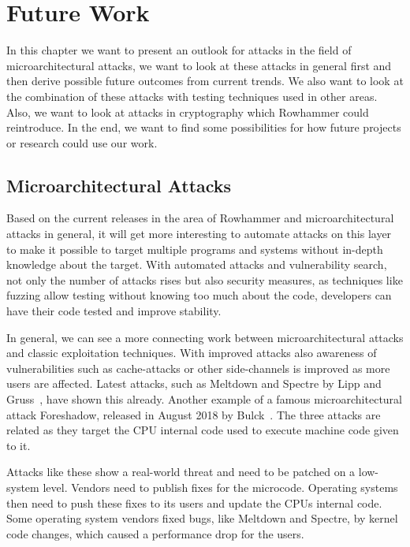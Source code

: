 \chapter{Future Work}\label{sec:futurework}

In this chapter we want to present an outlook for attacks in the field of
microarchitectural attacks, we want to look at these attacks in general first
and then derive possible future outcomes from current trends. We also want to
look at the combination of these attacks with testing techniques used in other
areas. Also, we want to look at attacks in cryptography which Rowhammer could
reintroduce. In the end, we want to find some possibilities for how future
projects or research could use our work.

\section{Microarchitectural Attacks}

Based on the current releases in the area of Rowhammer and microarchitectural
attacks in general, it will get more interesting to automate attacks on this
layer to make it possible to target multiple programs and systems without
in-depth knowledge about the target. With automated attacks and vulnerability
search, not only the number of attacks rises but also security measures, as
techniques like fuzzing allow testing without knowing too much about the code,
developers can have their code tested and improve stability.

In general, we can see a more connecting work between microarchitectural attacks
and classic exploitation techniques. With improved attacks also awareness of
vulnerabilities such as cache-attacks or other side-channels is improved as more
users are affected. Latest attacks, such as Meltdown\cite{meltdown} and
Spectre\cite{spectre} by Lipp and Gruss~\etal, have shown this already. Another
example of a famous microarchitectural attack Foreshadow\cite{foreshadow},
released in August 2018 by Bulck~\etal. The three attacks are related as they
target the CPU internal code used to execute machine code given to it.

Attacks like these show a real-world threat and need to be patched on a
low-system level. Vendors need to publish fixes for the microcode. Operating
systems then need to push these fixes to its users and update the
CPU\textquotesingle s internal code. Some operating system vendors fixed
bugs, like Meltdown and Spectre, by kernel code changes, which caused a
performance drop for the users.

